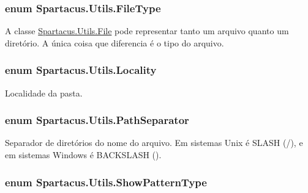 \hypertarget{namespaceSpartacus_1_1Utils_a2bc44488e88db523cb2dcffaa6e77541}{
\subsubsection[{File\+Type}]{\setlength{\rightskip}{0pt plus 5cm}enum {\bf Spartacus.\+Utils.\+File\+Type}}}\label{namespaceSpartacus_1_1Utils_a2bc44488e88db523cb2dcffaa6e77541}


A classe \hyperlink{classSpartacus_1_1Utils_1_1File}{Spartacus.\+Utils.\+File} pode representar tanto um arquivo quanto um diretório. A única coisa que diferencia é o tipo do arquivo. 

\hypertarget{namespaceSpartacus_1_1Utils_a64d6efe7b3923d4631036138e1b8b57f}{
\subsubsection[{Locality}]{\setlength{\rightskip}{0pt plus 5cm}enum {\bf Spartacus.\+Utils.\+Locality}}}\label{namespaceSpartacus_1_1Utils_a64d6efe7b3923d4631036138e1b8b57f}


Localidade da pasta. 

\hypertarget{namespaceSpartacus_1_1Utils_a9ee24558a33d60b42674bae3eed2a094}{
\subsubsection[{Path\+Separator}]{\setlength{\rightskip}{0pt plus 5cm}enum {\bf Spartacus.\+Utils.\+Path\+Separator}}}\label{namespaceSpartacus_1_1Utils_a9ee24558a33d60b42674bae3eed2a094}


Separador de diretórios do nome do arquivo. Em sistemas Unix é S\+L\+A\+S\+H (/), e em sistemas Windows é B\+A\+C\+K\+S\+L\+A\+S\+H (). 

\hypertarget{namespaceSpartacus_1_1Utils_a39dc52f76b36470069f38f3e8b1cd73e}{
\subsubsection[{Show\+Pattern\+Type}]{\setlength{\rightskip}{0pt plus 5cm}enum {\bf Spartacus.\+Utils.\+Show\+Pattern\+Type}}}\label{namespaceSpartacus_1_1Utils_a39dc52f76b36470069f38f3e8b1cd73e}


